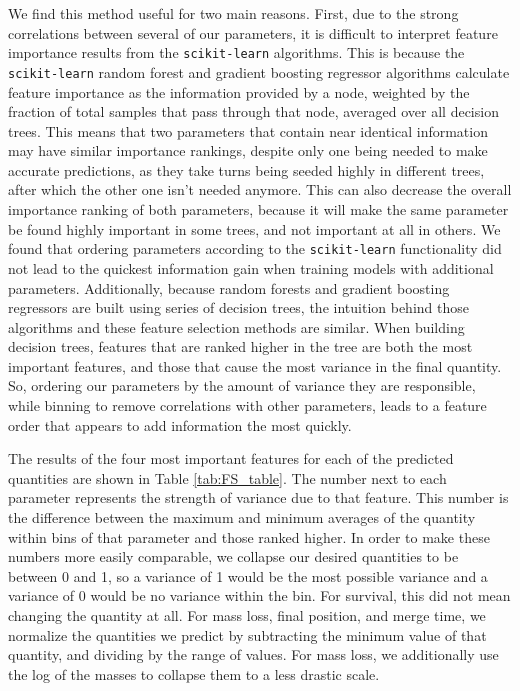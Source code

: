 \documentclass[fleqn,usenatbib]{mnras}
\begin{document}
We find this method useful for two main reasons. First, due to the strong correlations between several of our parameters, it is difficult to interpret feature importance results from the \texttt{scikit-learn} algorithms. This is because the \texttt{scikit-learn} random forest and gradient boosting regressor algorithms calculate feature importance as the information provided by a node, weighted by the fraction of total samples that pass through that node, averaged over all decision trees. This means that two parameters that contain near identical information may have similar importance rankings, despite only one being needed to make accurate predictions, as they take turns being seeded highly in different trees, after which the other one isn't needed anymore. This can also decrease the overall importance ranking of both parameters, because it will make the same parameter be found highly important in some trees, and not important at all in others. We found that ordering parameters according to the \texttt{scikit-learn} functionality did not lead to the quickest information gain when training models with additional parameters. Additionally, because random forests and gradient boosting regressors are built using series of decision trees, the intuition behind those algorithms and these feature selection methods are similar. When building decision trees, features that are ranked higher in the tree are both the most important features, and those that cause the most variance in the final quantity. So, ordering our parameters by the amount of variance they are responsible, while binning to remove correlations with other parameters, leads to a feature order that appears to add information the most quickly.

The results of the four most important features for each of the predicted quantities are shown in Table \ref{tab:FS_table}. The number next to each parameter represents the strength of variance due to that feature. This number is the difference between the maximum and minimum averages of the quantity within bins of that parameter and those ranked higher. In order to make these numbers more easily comparable, we collapse our desired quantities to be between 0 and 1, so a variance of 1 would be the most possible variance and a variance of 0 would be no variance within the bin. For survival, this did not mean changing the quantity at all. For mass loss, final position, and merge time, we normalize the quantities we predict by subtracting the minimum value of that quantity, and dividing by the range of values. For mass loss, we additionally use the log of the masses to collapse them to a less drastic scale. 
\end{document}
